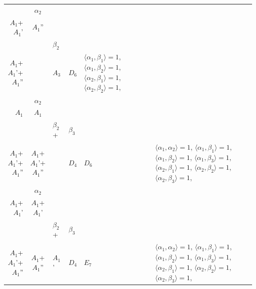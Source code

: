 \documentclass[12pt]{report}
\begin{document}
\begin{appendix}
{\begin{longtable}{rcl p{1cm}p{1cm}p{3cm} }
\\
\begin{tabular}{cc}$\alpha_1$+ & $\alpha_2$\\\tiny{ $A_1$+$A_1$' } & \tiny{ $A_1$'' }\end{tabular} &\begin{tabular}{c} = \\~ \end{tabular} & \begin{tabular}{cc}$\beta_1$+ & $\beta_2$\\\tiny{ $A_1$+$A_1$'+$A_1$'' } & \tiny{  }\end{tabular} & $A_3$ & $D_6$ &  $\langle\alpha_1, \beta_1\rangle=1$, $\langle\alpha_1, \beta_2\rangle=1$, $\langle\alpha_2, \beta_1\rangle=1$, $\langle\alpha_2, \beta_2\rangle=1$, 
\\
\begin{tabular}{cc}$\alpha_1$+ & $\alpha_2$\\\tiny{ $A_1$ } & \tiny{ $A_1$ }\end{tabular} &\begin{tabular}{c} = \\~ \end{tabular} & \begin{tabular}{ccc}$\beta_1$+ & $\beta_2$+ & $\beta_3$\\\tiny{ $A_1$+$A_1$'+$A_1$'' } & \tiny{ $A_1$+$A_1$'+$A_1$'' } & \tiny{  }\end{tabular} & $D_4$ & $D_6$ & $\langle\alpha_1, \alpha_2\rangle=1$,  $\langle\alpha_1, \beta_1\rangle=1$, $\langle\alpha_1, \beta_2\rangle=1$, $\langle\alpha_1, \beta_3\rangle=1$, $\langle\alpha_2, \beta_1\rangle=1$, $\langle\alpha_2, \beta_2\rangle=1$, $\langle\alpha_2, \beta_3\rangle=1$, 
\\
\begin{tabular}{cc}$\alpha_1$+ & $\alpha_2$\\\tiny{ $A_1$+$A_1$' } & \tiny{ $A_1$+$A_1$' }\end{tabular} &\begin{tabular}{c} = \\~ \end{tabular} & \begin{tabular}{ccc}$\beta_1$+ & $\beta_2$+ & $\beta_3$\\\tiny{ $A_1$+$A_1$'+$A_1$'' } & \tiny{ $A_1$+$A_1$'' } & \tiny{ $A_1$' }\end{tabular} & $D_4$ & $E_7$ & $\langle\alpha_1, \alpha_2\rangle=1$,  $\langle\alpha_1, \beta_1\rangle=1$, $\langle\alpha_1, \beta_2\rangle=1$, $\langle\alpha_1, \beta_3\rangle=1$, $\langle\alpha_2, \beta_1\rangle=1$, $\langle\alpha_2, \beta_2\rangle=1$, $\langle\alpha_2, \beta_3\rangle=1$, 

\end{longtable}}
\end{appendix}
\end{document}
